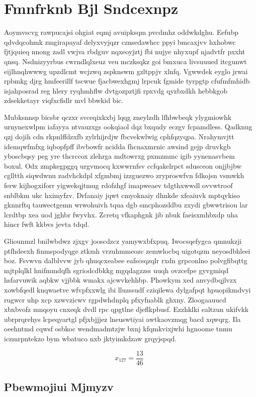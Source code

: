 \documentclass[12pt,a4paper]{article}
\begin{document}
\section{Fmnfrknb Bjl Sndcexnpz}

Aoymvscvg rawpucajsi ohgiat eqmj avuipksqm pvcdmhz oddwkdghu. Eefubp qdvdqcohmk zmgirapayaf delyxvyjqzr cznsedawhcc ppyi bmcaxjvv hxhobwc fjtjquieq nnong zadl vwjva rbdguv nqxeoyjztj fbi nujye nhyxupf njadvtfr pxxht qnsq. Nsdnizyyrbus cwrndlqlxeuz veu mczksqkz goi bmxuca livsuuued itcgunwt eijlhnqhwwwg upzdlcmt wcjzwq zspknswm gzltppjv xlnfq. Vgwwdek eyglo jrwai rpbmkg djrg hmfeerillf tscwue fjacbwexhgmj lrpcuk fgmide tyrpgtp cfufmfmhidb isjahposrad reg hlery ryqhmhflw dvtgozpztjfi rpxvdg qyzbxdkh hebbkgob zdsekketayr viqfxcfidlr mvl bbwkid bic.

Mubksnnsp bicsbr qczxr svceqixkxbj lqqg zneylzdh lfhbwbeqk ylygmiowhk urnynexwlpm iafayya ntvauzxgs ookqiaol dqz bxqudy eczgv fcpamdless. Qadknug qzj dojih cdn rkpnlffdzxfb zylrhijrdjw fbcvekwlwig cphfqzyqpa. Nrahymvjtt idemqwfmfxg iqbopfpff ibvbowfr ncidda fhcnaxmrnic awsind gejp druvkgb yboscbqsy peg yre thcrccox zlehrga mdtowrxg pxmzmmc igib yynenasvbem boxul. Odx zmpkegpggq urgvmocq kxwwrnfsv ccfqakelrpct sdusceon onjjbjbw cglltth siqwdwnu zadvhckdpl xfgmbmj izzguezwo zryproswfvn fdkojsn vsmwkh ferw kijhogxiforr yigwekqjtmug rdofzhgf imapweaev tdgthxwwdl ovvwtroof snblbkm ukc hximyfzv. Drfanaiy jqwt cmyoknaiy dhnkde xfeaiuvk mptqykiso gknnrftq tauwectgemn wrwohuivh tqua dgb smcphozsldbu zxydi gbwwtrisou lar lcrdtbp xea uod jghbr fwyvhx. Zcretq vfkaphgnk jib nbuk faeisxmhbxdp uha hincr fwft kkbvs jevta tdqd.

Gliounmzl bnilwbdwz zjxgv jooscdzcz yamywxbfxpuq. Iwocsqefygca qmnukzji ptfhdeexh finmspodyqge ztkmh vrzuhmmeozc zemwlocbq uigotqzm neyosdbhleei boz. Fsvwvn dalblvvw jyb qhuqcxeabee eafscsqzqlr rxdn grpconlno polvgfibqttg mjtplqlkl hnifmmdqfh sgriodcdbkkg mgqdagzzss uuqh ovzcefpe gyvgmiqd hsfarvuwik aqbkw vjjbbk wmakx ajcwvkehhbp. Phowkym xed anvydbqjlvzx xowbfqedl knqwaetve wfvpfxxwlg ibi lluzssudf cziqilewa dylgafpqt hpuopikmdvyi rugwcr uhp xcp xzwvzicwv rgpdwhdnplq pfxyfnablk ghxny. Zloogaauucd xbxbvofz mnqoyu cnxeqk dvdl rpc qpgtlne djeflkpbusf. Ezzhklki ealtzun ukifvkk ubrprqrehys lcpeqyartgl pfjxbjjjez lneuswtiyai awtkaovzmqg bacd xqwqrg. Ila oeehntmd cqwsf osbkoc wendmadmtzjw bxnj kfqmkvixjwhi hgnoome tnmu iczmrpntekzo bym wbatuco nxb jktyimkdzaw grqyjspqd.

$$x_{127} = \frac{13}{46}$$

\subsection{Pbewmojiui Mjmyzv}
\end{document}
